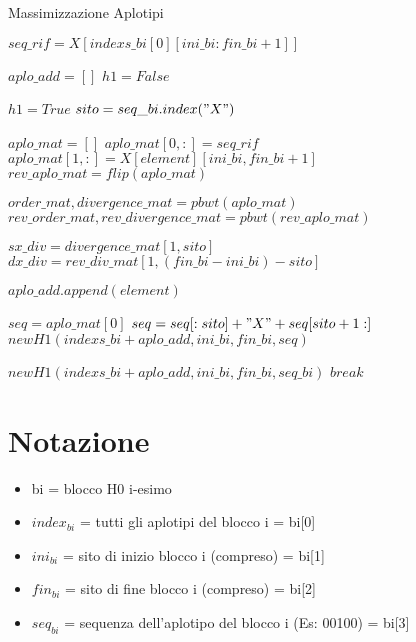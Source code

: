 \documentclass{article}
\begin{document}
\begin{algorithm}
\caption{Massimizzazione Aplotipi}\label{alg:cap}
\begin{algorithmic}
        \State $seq\_rif = X[indexs\_bi[0][ini\_bi:fin\_bi+1]]$
        
            \State $aplo\_add = []$
            \State $h1 = False$
            
                \State $h1 = True$
                \State $sito = seq\_bi.index("X")$
            \EndIf
            
                    \State $aplo\_mat = [ ]$
                    \State $aplo\_mat[0, :] = seq\_rif$
                    \State $aplo\_mat[1, :] = X[element][ini\_bi, fin\_bi+1]$
                    \State $rev\_aplo\_mat = flip(aplo\_mat)$
                    
                    \State $order\_mat, divergence\_mat = pbwt(aplo\_mat)$
                    \State $rev\_order\_mat, rev\_divergence\_mat = pbwt(rev\_aplo\_mat)$
                    
                    \State $sx\_div = divergence\_mat[1, sito]$
                    \State $dx\_div = rev\_div\_mat[1, (fin\_bi-ini\_bi) - sito]$
                    
                        \State $aplo\_add.append(element)$
                    \EndIf
                \EndIf
            \EndFor
            
                \State $seq = aplo\_mat[0]$
                \State $seq = seq[:sito] + "X" + seq[sito+1:]$
                \State $new H1(indexs\_bi + aplo\_add, ini\_bi, fin\_bi, seq)$
            \EndIf
            
                \State $new H1(indexs\_bi + aplo\_add, ini\_bi, fin\_bi, seq\_bi)$
                \State $break$
            \EndIf
        \EndFor
    \EndFor
    
\end{algorithmic}
\end{algorithm}

\section{Notazione}

\begin{itemize}
    \item bi = blocco H0 i-esimo
    \item $index_{bi}$ = tutti gli aplotipi del blocco i = bi[0]
    \item $ini_{bi}$ = sito di inizio blocco i (compreso) = bi[1]
    \item $fin_{bi}$ = sito di fine blocco i (compreso) = bi[2]
    \item $seq_{bi}$ = sequenza dell'aplotipo del blocco i (Es: 00100) = bi[3]

\end{itemize}
\end{document}
